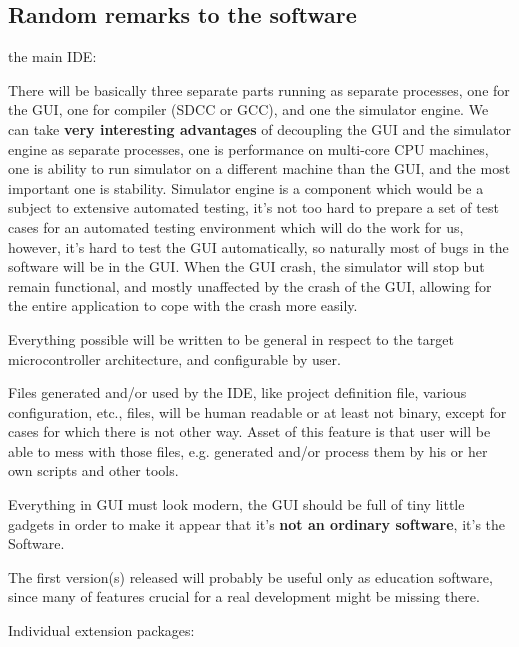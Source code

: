 \documentclass[a4paper,twoside,15pt]{book}
\begin{document}
		\subsection{Random remarks to the software}
			\begin{dinglist}{73}
				\item the main IDE:
					\begin{dinglist}{75}
						\item There will be basically three separate parts running as separate processes, one for the GUI, one for compiler (SDCC or GCC), and one the simulator engine. We can take \textbf{very interesting advantages} of decoupling the GUI and the simulator engine as separate processes, one is performance on multi-core CPU machines, one is ability to run simulator on a different machine than the GUI, and the most important one is stability. Simulator engine is a component which would be a subject to extensive automated testing, it's not too hard to prepare a set of test cases for an automated testing environment which will do the work for us, however, it's hard to test the GUI automatically, so naturally most of bugs in the software will be in the GUI. When the GUI crash, the simulator will stop but remain functional, and mostly unaffected by the crash of the GUI, allowing for the entire application to cope with the crash more easily.
						\item Everything possible will be written to be general in respect to the target microcontroller architecture, and configurable by user.
						\item Files generated and/or used by the IDE, like project definition file, various configuration, etc., files, will be human readable or at least not binary, except for cases for which there is not other way. Asset of this feature is that user will be able to mess with those files, e.g. generated and/or process them by his or her own scripts and other tools.
						\item Everything in GUI must look modern, the GUI should be full of tiny little gadgets in order to make it appear that it's \textbf{not an ordinary software}, it's the Software.
						\item The first version(s) released will probably be useful only as education software, since many of features crucial for a real development might be missing there.
					\end{dinglist}
				\item Individual extension packages:
					\begin{dinglist}{75}

\end{dinglist}
\end{dinglist}
\end{document}
